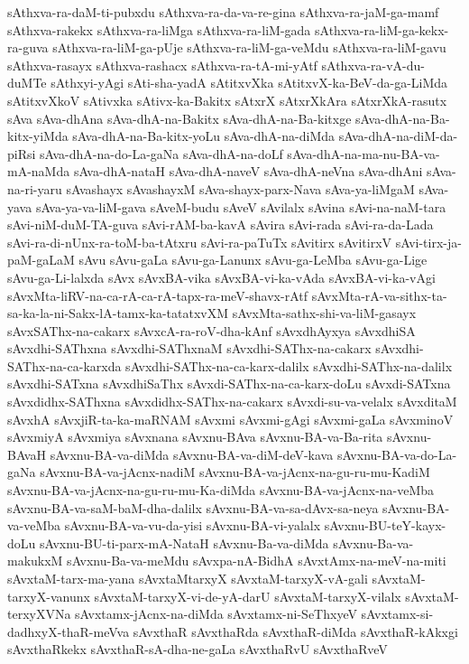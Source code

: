 {sAthxva-ra-daM-ti-pubxdu
sAthxva-ra-da-va-re-gina
sAthxva-ra-jaM-ga-mamf
sAthxva-rakekx
sAthxva-ra-liMga
sAthxva-ra-liM-gada
sAthxva-ra-liM-ga-kekx-ra-guva
sAthxva-ra-liM-ga-pUje
sAthxva-ra-liM-ga-veMdu
sAthxva-ra-liM-gavu
sAthxva-rasayx
sAthxva-rashacx
sAthxva-ra-tA-mi-yAtf
sAthxva-ra-vA-du-duMTe
sAthxyi-yAgi
sAti-sha-yadA
sAtitxvXka
sAtitxvX-ka-BeV-da-ga-LiMda
sAtitxvXkoV
sAtivxka
sAtivx-ka-Bakitx
sAtxrX
sAtxrXkAra
sAtxrXkA-rasutx
sAva
sAva-dhAna
sAva-dhA-na-Bakitx
sAva-dhA-na-Ba-kitxge
sAva-dhA-na-Ba-kitx-yiMda
sAva-dhA-na-Ba-kitx-yoLu
sAva-dhA-na-diMda
sAva-dhA-na-diM-da-piRsi
sAva-dhA-na-do-La-gaNa
sAva-dhA-na-doLf
sAva-dhA-na-ma-nu-BA-va-mA-naMda
sAva-dhA-nataH
sAva-dhA-naveV
sAva-dhA-neVna
sAva-dhAni
sAva-na-ri-yaru
sAvashayx
sAvashayxM
sAva-shayx-parx-Nava
sAva-ya-liMgaM
sAva-yava
sAva-ya-va-liM-gava
sAveM-budu
sAveV
sAvilalx
sAvina
sAvi-na-naM-tara
sAvi-niM-duM-TA-guva
sAvi-rAM-ba-kavA
sAvira
sAvi-rada
sAvi-ra-da-Lada
sAvi-ra-di-nUnx-ra-toM-ba-tAtxru
sAvi-ra-paTuTx
sAvitirx
sAvitirxV
sAvi-tirx-ja-paM-gaLaM
sAvu
sAvu-gaLa
sAvu-ga-Lanunx
sAvu-ga-LeMba
sAvu-ga-Lige
sAvu-ga-Li-lalxda
sAvx
sAvxBA-vika
sAvxBA-vi-ka-vAda
sAvxBA-vi-ka-vAgi
sAvxMta-liRV-na-ca-rA-ca-rA-tapx-ra-meV-shavx-rAtf
sAvxMta-rA-va-sithx-ta-sa-ka-la-ni-Sakx-lA-tamx-ka-tatatxvXM
sAvxMta-sathx-shi-va-liM-gasayx
sAvxSAThx-na-cakarx
sAvxcA-ra-roV-dha-kAnf
sAvxdhAyxya
sAvxdhiSA
sAvxdhi-SAThxna
sAvxdhi-SAThxnaM
sAvxdhi-SAThx-na-cakarx
sAvxdhi-SAThx-na-ca-karxda
sAvxdhi-SAThx-na-ca-karx-dalilx
sAvxdhi-SAThx-na-dalilx
sAvxdhi-SATxna
sAvxdhiSaThx
sAvxdi-SAThx-na-ca-karx-doLu
sAvxdi-SATxna
sAvxdidhx-SAThxna
sAvxdidhx-SAThx-na-cakarx
sAvxdi-su-va-velalx
sAvxditaM
sAvxhA
sAvxjiR-ta-ka-maRNAM
sAvxmi
sAvxmi-gAgi
sAvxmi-gaLa
sAvxminoV
sAvxmiyA
sAvxmiya
sAvxnana
sAvxnu-BAva
sAvxnu-BA-va-Ba-rita
sAvxnu-BAvaH
sAvxnu-BA-va-diMda
sAvxnu-BA-va-diM-deV-kava
sAvxnu-BA-va-do-La-gaNa
sAvxnu-BA-va-jAcnx-nadiM
sAvxnu-BA-va-jAcnx-na-gu-ru-mu-KadiM
sAvxnu-BA-va-jAcnx-na-gu-ru-mu-Ka-diMda
sAvxnu-BA-va-jAcnx-na-veMba
sAvxnu-BA-va-saM-baM-dha-dalilx
sAvxnu-BA-va-sa-dAvx-sa-neya
sAvxnu-BA-va-veMba
sAvxnu-BA-va-vu-da-yisi
sAvxnu-BA-vi-yalalx
sAvxnu-BU-teY-kayx-doLu
sAvxnu-BU-ti-parx-mA-NataH
sAvxnu-Ba-va-diMda
sAvxnu-Ba-va-makukxM
sAvxnu-Ba-va-meMdu
sAvxpa-nA-BidhA
sAvxtAmx-na-meV-na-miti
sAvxtaM-tarx-ma-yana
sAvxtaMtarxyX
sAvxtaM-tarxyX-vA-gali
sAvxtaM-tarxyX-vanunx
sAvxtaM-tarxyX-vi-de-yA-darU
sAvxtaM-tarxyX-vilalx
sAvxtaM-terxyXVNa
sAvxtamx-jAcnx-na-diMda
sAvxtamx-ni-SeThxyeV
sAvxtamx-si-dadhxyX-thaR-meVva
sAvxthaR
sAvxthaRda
sAvxthaR-diMda
sAvxthaR-kAkxgi
sAvxthaRkekx
sAvxthaR-sA-dha-ne-gaLa
sAvxthaRvU
sAvxthaRveV
}
